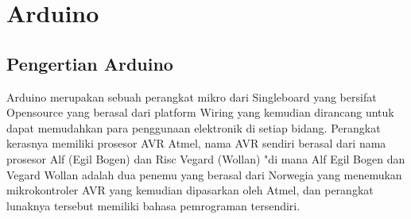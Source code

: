\section{Arduino}
\subsection{Pengertian Arduino}
Arduino merupakan sebuah perangkat mikro dari Singleboard yang bersifat Opensource yang berasal dari platform Wiring
yang kemudian dirancang untuk dapat memudahkan para penggunaan elektronik di setiap bidang. Perangkat kerasnya memiliki prosesor AVR Atmel, 
nama AVR sendiri berasal dari nama prosesor Alf (Egil Bogen) dan Risc Vegard (Wollan) "di mana Alf Egil Bogen dan Vegard Wollan adalah dua 
penemu yang berasal dari Norwegia yang menemukan mikrokontroler AVR yang kemudian dipasarkan oleh Atmel, dan perangkat lunaknya tersebut 
memiliki bahasa pemrograman tersendiri. 
